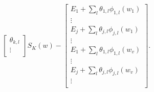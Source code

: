 \documentclass[12pt]{article}
\begin{document}
\begin{equation}
\begin{split}
{\begin{bmatrix}
                \theta_{k,l} \\
                \vdots \\
            \end{bmatrix}
        }{S_K(w)}
        - 
        \begin{bmatrix}
            E_1 + \sum_l \theta_{1,l} \phi_{1,l}(w_1) \\
            \vdots \\
            E_j + \sum_l \theta_{j,l} \phi_{j,l}(w_1) \\
            \vdots \\
            E_1 + \sum_l \theta_{1,l} \phi_{1,l}(w_v) \\
            \vdots \\
            E_j + \sum_l \theta_{j,l} \phi_{j,l}(w_v) \\
            \vdots \\
        \end{bmatrix}
        .
    \end{split}
\end{equation}
\end{document}
